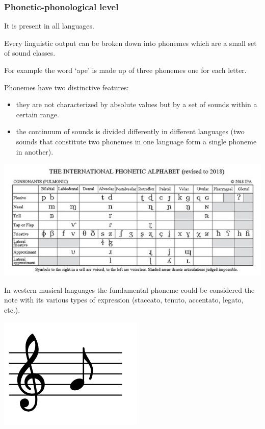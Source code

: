 \subsubsection{Phonetic-phonological level }\label{phonetic-phonological-level}

It is present in all languages.

Every linguistic output can be broken down into phonemes which are a small set of sound classes.

For example the word `ape' is made up of three phonemes one for each letter.

Phonemes have two distinctive features: 

\begin{itemize}
\item they are not characterized by absolute values but by a set of sounds within a certain range. 
\item the continuum of sounds is divided differently in different languages (two sounds that constitute two phonemes in one language form a single phoneme in another).
\end{itemize}

\begin{center}
\includegraphics[scale=0.9]{../img/fonemi_2.png}
\end{center}

In western musical languages the fundamental phoneme could be considered the note with its various types of expression (staccato, tenuto, accentato, legato, etc.).

\begin{center}
\includegraphics[scale=0.22]{../img/nota.png}
\end{center}

